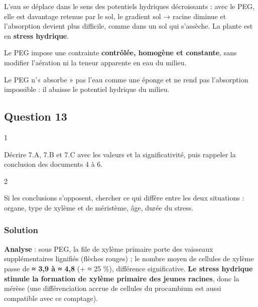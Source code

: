 \documentclass[11pt,a4paper]{article}
\begin{document}
L'eau se déplace dans le sens des potentiels hydriques décroissants : avec le PEG, elle est davantage retenue par le sol, le gradient sol → racine diminue et l'absorption devient plus difficile, comme dans un sol qui s'assèche. La plante est en \textbf{stress hydrique}.

Le PEG impose une contrainte \textbf{contrôlée, homogène et constante}, sans modifier l'aération ni la teneur apparente en eau du milieu.

\begin{piege}

Le PEG n'« absorbe » pas l'eau comme une éponge et ne rend pas l'absorption impossible : il abaisse le potentiel hydrique du milieu.

\end{piege}

\hypertarget{question-13}{%
\subsection{Question 13}\label{question-13}}

\begin{indication}{1}

Décrire 7.A, 7.B et 7.C avec les valeurs et la significativité, puis rappeler la conclusion des documents 4 à 6.

\end{indication}

\begin{indication}{2}

Si les conclusions s'opposent, chercher ce qui diffère entre les deux situations : organe, type de xylème et de méristème, âge, durée du stress.

\end{indication}

\hypertarget{solution-12}{%
\subsubsection{Solution}\label{solution-12}}

\textbf{Analyse} : sous PEG, la file de xylème primaire porte des vaisseaux supplémentaires lignifiés (flèches rouges) ; le nombre moyen de cellules de xylème passe de \textbf{≈ 3,9 à ≈ 4,8} (+ ≈ 25 \%), différence significative. \textbf{Le stress hydrique stimule la formation de xylème primaire des jeunes racines}, donc la mérèse (une différenciation accrue de cellules du procambium est aussi compatible avec ce comptage).
\end{document}
